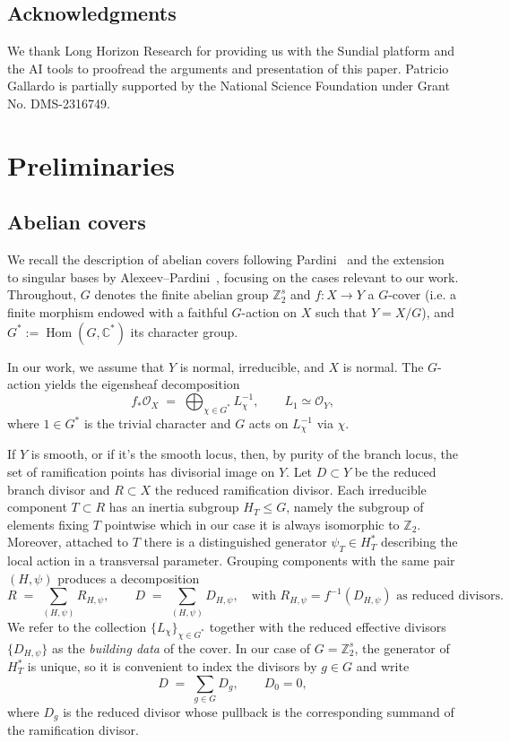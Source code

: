 \documentclass[12pt,twoside,]{amsart}
\theoremstyle{plain}
\theoremstyle{definition}
\newcommand{\OO}{\mathcal O}
\begin{document}
\subsection{Acknowledgments} 
We thank Long Horizon Research
for providing us with the Sundial platform and the AI tools to proofread the arguments and presentation of this paper.
Patricio Gallardo is partially supported by the National Science Foundation under Grant No. DMS-2316749. 
\tableofcontents

\section{Preliminaries}
\subsection{Abelian covers}\label{sec:abelianCovers}

We recall the description of abelian covers following Pardini~\cite{pardini1991abelian} and the extension to singular bases by Alexeev--Pardini~\cite{AP12}, focusing on the cases relevant to our work. 
Throughout, $G$ denotes the finite abelian group $\mathbb{Z}_2^s$ and  
$f\colon X\to Y$ a $G$-cover (i.e. a finite morphism endowed with a faithful 
$G$-action on $X$ 
such that $Y=X/G$), and $G^*:=\operatorname{Hom}(G,\mathbb{C}^*)$ its character group.


In our work, we assume that $Y$ is normal, irreducible, and $X$ is normal. The $G$-action yields the eigensheaf decomposition
\begin{equation}\label{eq:decomposition}
f_*\OO_X \;=\; \bigoplus_{\chi\in G^*} L_\chi^{-1},
\qquad
L_{1}\simeq \OO_Y,
\end{equation}
where $1\in G^*$ is the trivial character and $G$ acts on $L_\chi^{-1}$ via $\chi$.

If $Y$ is smooth, or if it's the smooth locus, then, by purity of the branch locus, the set of ramification points has divisorial image on $Y$. Let $D\subset Y$ be the reduced branch divisor and $R\subset X$ the reduced ramification divisor. Each irreducible component
$T\subset R$ has an inertia subgroup $H_T\le G$, namely the subgroup of elements fixing $T$ pointwise which in our case it is always isomorphic to $\mathbb{Z}_2$. Moreover, attached to $T$ there is a distinguished generator $\psi_T\in H_T^*$ describing the local
action in a transversal parameter. Grouping components with the same pair $(H,\psi)$ produces a decomposition
\[
R \;=\; \sum_{(H,\psi)} R_{H,\psi},
\qquad
D \;=\; \sum_{(H,\psi)} D_{H,\psi},
\quad
\text{with } R_{H,\psi}=f^{-1}(D_{H,\psi}) \text{ as reduced divisors.}
\]
We refer to the collection $\{L_\chi\}_{\chi\in G^*}$ together with the reduced effective divisors
$\{D_{H,\psi}\}$ as the \emph{building data} of the cover. In our case of $G  = \mathbb{Z}_2^s$, the generator of $H_T^*$ is unique, so it is convenient to index the divisors by
$g\in G$ and write
\begin{equation}\label{eq:Dg_decomp}
D \;=\; \sum_{g\in G} D_g,
\qquad D_0=0,
\end{equation}
where $D_g$ is the reduced divisor whose pullback is the corresponding summand of the ramification divisor.
\end{document}
